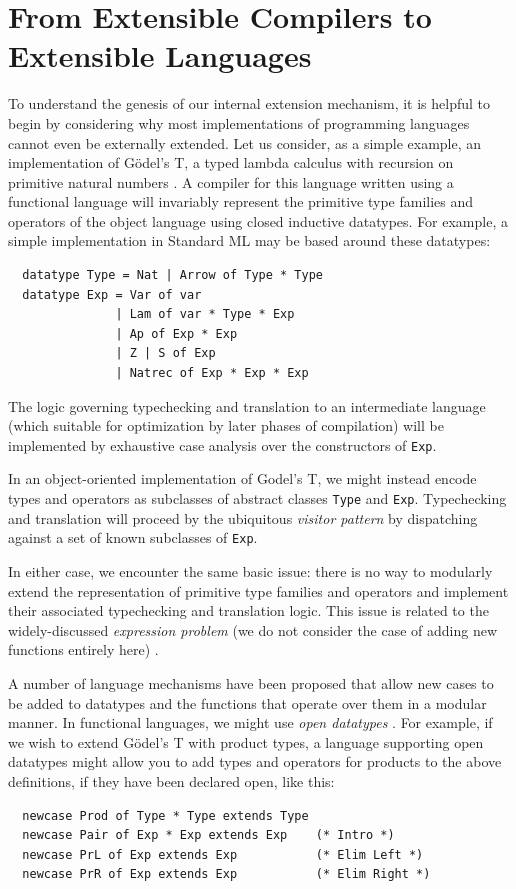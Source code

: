 \documentclass{llncs}
\begin{document}
\section{From Extensible Compilers to Extensible Languages}\label{evolution}
To understand the genesis of our internal extension mechanism, it is helpful to begin by considering why most implementations of programming languages cannot even be  externally extended. 
Let us consider, as a simple example, an implementation of G\"odel's T, a typed lambda calculus with recursion on primitive natural numbers  \cite{pfpl}. 
A compiler for this language written using a functional language will invariably represent the primitive type families and operators of the object language using {closed} inductive datatypes. 
For example, a simple implementation in Standard ML may be based around these datatypes:
\begin{lstlisting}
  datatype Type = Nat | Arrow of Type * Type
  datatype Exp = Var of var 
               | Lam of var * Type * Exp
               | Ap of Exp * Exp 
               | Z | S of Exp 
               | Natrec of Exp * Exp * Exp
\end{lstlisting}

The logic governing typechecking and translation to an intermediate language (which suitable for optimization by later phases of compilation) will be implemented by exhaustive case analysis over the constructors of \lstinline{Exp}.

In an object-oriented implementation of Godel's T, we might instead encode types and operators as subclasses of abstract classes \lstinline{Type} and \lstinline{Exp}. Typechecking and translation will proceed by the ubiquitous \emph{visitor pattern} \cite{visitor} by dispatching against a set of {known} subclasses of \lstinline{Exp}. 

In either case, we encounter the same basic issue: there is no way to modularly extend the representation of primitive type families and operators and implement their associated typechecking and translation logic. 
This issue is related to the widely-discussed \emph{expression problem} (we do not consider the case of adding new functions entirely here) \cite{wadler-expression}.

A number of language mechanisms have been proposed that allow new cases to be added to datatypes and the functions that operate over them in a modular manner. 
In functional languages, we might use \emph{open datatypes} \cite{open-datatypes}. For example, if we wish to extend G\"odel's T with product types, a language supporting open datatypes might allow you to add types and operators for products to the above definitions, if they have been declared open, like this: 
\begin{lstlisting}
  newcase Prod of Type * Type extends Type
  newcase Pair of Exp * Exp extends Exp    (* Intro *)
  newcase PrL of Exp extends Exp           (* Elim Left *)
  newcase PrR of Exp extends Exp           (* Elim Right *)
\end{lstlisting}
\end{document}
